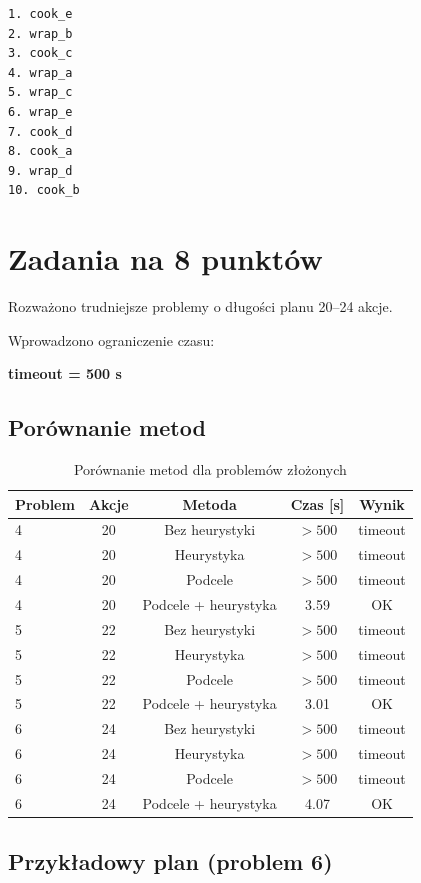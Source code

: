 \documentclass[a4paper,12pt]{article}
\begin{document}
\begin{verbatim}
1. cook_e
2. wrap_b
3. cook_c
4. wrap_a
5. wrap_c
6. wrap_e
7. cook_d
8. cook_a
9. wrap_d
10. cook_b
\end{verbatim}

\clearpage
\section{Zadania na 8 punktów}

Rozważono trudniejsze problemy o długości planu 20--24 akcje.

Wprowadzono ograniczenie czasu:
\begin{center}
\textbf{timeout = 500 s}
\end{center}

\subsection{Porównanie metod}

\begin{table}[h!]
\centering
\begin{tabular}{lcccc}
\toprule
Problem & Akcje & Metoda & Czas [s] & Wynik \\
\midrule
4 & 20 & Bez heurystyki & $>500$ & timeout \\
4 & 20 & Heurystyka & $>500$ & timeout \\
4 & 20 & Podcele & $>500$ & timeout \\
4 & 20 & Podcele + heurystyka & 3.59 & OK \\
\midrule
5 & 22 & Bez heurystyki & $>500$ & timeout \\
5 & 22 & Heurystyka & $>500$ & timeout \\
5 & 22 & Podcele & $>500$ & timeout \\
5 & 22 & Podcele + heurystyka & 3.01 & OK \\
\midrule
6 & 24 & Bez heurystyki & $>500$ & timeout \\
6 & 24 & Heurystyka & $>500$ & timeout \\
6 & 24 & Podcele & $>500$ & timeout \\
6 & 24 & Podcele + heurystyka & 4.07 & OK \\
\bottomrule
\end{tabular}
\caption{Porównanie metod dla problemów złożonych}
\end{table}

\subsection{Przykładowy plan (problem 6)}
\end{document}

